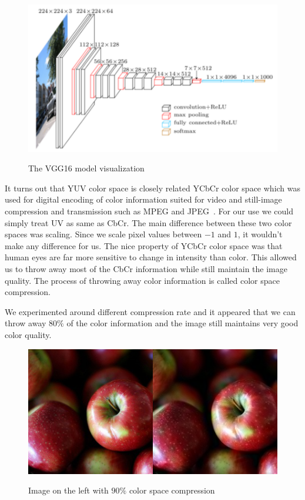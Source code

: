 \documentclass[12pt]{article}
\begin{document}
\begin{figure}[H]
 \centering
  \includegraphics[width=5.0in]{resource/vgg16.png}
\center
\label{fig:vggvis}
 \caption{The VGG16 model visualization}
\end{figure}

It turns out that YUV color space is closely related YCbCr color space which was used for digital encoding of color information suited for video and still-image compression and transmission such as MPEG and JPEG~\cite{YUVWIKI}. For our use we could simply treat UV as same as CbCr. The main difference between these two color spaces was scaling. Since we scale pixel values between $-1$ and $1$, it wouldn't make any difference for us. The nice property of YCbCr color space was that human eyes are far more sensitive to change in intensity than color. This allowed us to throw away most of the CbCr information while still maintain the image quality. The process of throwing away color information is called color space compression. 

We experimented around different compression rate and it appeared that we can throw away $80\%$ of the color information and the image still maintains very good color quality. 


\begin{figure}[H]
 \centering
  \includegraphics[width=5.0in]{resource/colorcompress.png}
 \label{yuvimage}
 \caption{Image on the left with $90\%$ color space compression}
\end{figure}
\end{document}
